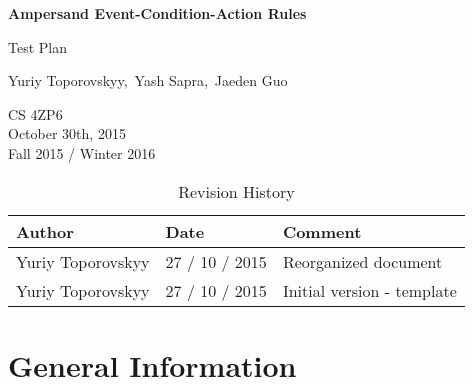 \documentclass[12pt]{report}
\begin{document}
\begin{titlepage}\begin{center}
\thispagestyle{empty} %

\vspace*{1cm}

{\Huge\textbf{Ampersand Event-Condition-Action Rules}}

\vspace{0.5cm}
{\Large Test Plan

\vspace{1.5cm}
Yuriy Toporovskyy,\ Yash Sapra,\ Jaeden Guo}
\vfill 


\end{center}
CS 4ZP6 \\
October 30th, 2015 \\ 
Fall 2015 / Winter 2016 
\end{titlepage}


\begin{table}[ht!]\begin{center}
\caption{Revision History}  
\begin{tabular}{|l|l|l|}\hline
\textbf{Author} & \textbf{Date} & \textbf{Comment} \\\hline 
Yuriy Toporovskyy & 27 / 10 / 2015 & Reorganized document \\\hline
Yuriy Toporovskyy & 27 / 10 / 2015 & Initial version - template \\\hline
\end{tabular}
\end{center}\end{table}

\newpage

\tableofcontents

\newpage
{} %

%
%

\chapter{General Information}\label{ch:General}
\end{document}
